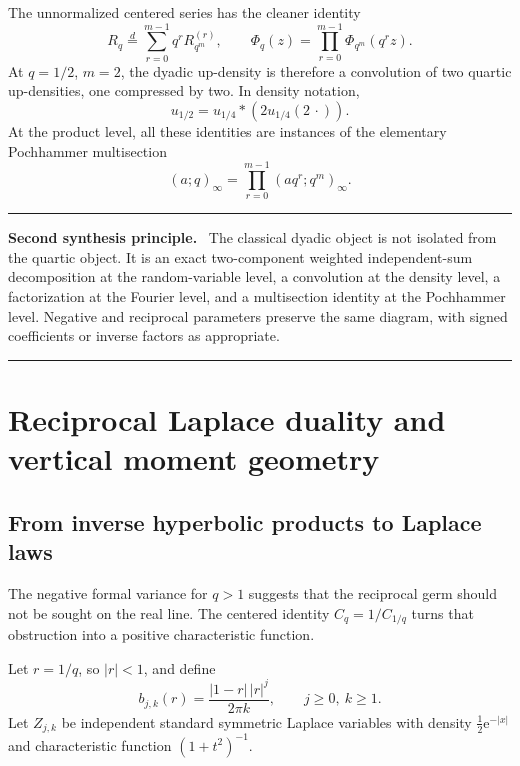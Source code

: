 \documentclass[11pt,oneside]{article}
\numberwithin{equation}{section}
\theoremstyle{definition}
\theoremstyle{remark}
\newcommand{\e}{\mathrm e}
\newenvironment{resultbox}[1]{%
  \par\medskip\noindent\begin{center}\begin{minipage}{0.94\textwidth}%
  \color{deepgreen}\hrule\vspace{0.65em}%
  \color{black}\textbf{\color{deepgreen}#1.}\ }{%
  \par\vspace{0.65em}\color{deepgreen}\hrule
  \end{minipage}\end{center}\medskip}
\begin{document}
The unnormalized centered series has the cleaner identity
\begin{equation}
 \boxed{
 R_q\stackrel d=\sum_{r=0}^{m-1}q^rR_{q^m}^{(r)},}
 \qquad
 \boxed{
 \Phi_q(z)=\prod_{r=0}^{m-1}\Phi_{q^m}(q^rz).}
 \label{eq:R-Phi-multisection}
\end{equation}
At $q=1/2$, $m=2$, the dyadic up-density is therefore a convolution of two
quartic up-densities, one compressed by two.  In density notation,
\begin{equation}
 u_{1/2}=u_{1/4}*\left(2u_{1/4}(2\,\cdot)\right).
 \label{eq:up-quartic-convolution}
\end{equation}
At the product level, all these identities are instances of the elementary
Pochhammer multisection
\begin{equation}
 (a;q)_\infty=\prod_{r=0}^{m-1}(aq^r;q^m)_\infty.
 \label{eq:Pochhammer-multisection}
\end{equation}

\begin{resultbox}{Second synthesis principle}
The classical dyadic object is not isolated from the quartic object.  It is an
exact two-component weighted independent-sum decomposition at the random-variable
level, a convolution
at the density level, a factorization at the Fourier level, and a multisection
identity at the Pochhammer level.  Negative and reciprocal parameters preserve
the same diagram, with signed coefficients or inverse factors as appropriate.
\end{resultbox}

\section{Reciprocal Laplace duality and vertical moment geometry}
\label{sec:laplace-dual}

\subsection{From inverse hyperbolic products to Laplace laws}

The negative formal variance for $q>1$ suggests that the reciprocal germ should
not be sought on the real line.  The centered identity
$C_q=1/C_{1/q}$ turns that obstruction into a positive characteristic
function.

Let $r=1/q$, so $|r|<1$, and define
\begin{equation}
 b_{j,k}(r)=\frac{|1-r|\,|r|^j}{2\pi k},
 \qquad j\ge0,\ k\ge1.
 \label{eq:b-jk}
\end{equation}
Let $Z_{j,k}$ be independent standard symmetric Laplace variables with density
$\frac12\e^{-|x|}$ and characteristic function
$(1+t^2)^{-1}$.
\end{document}
